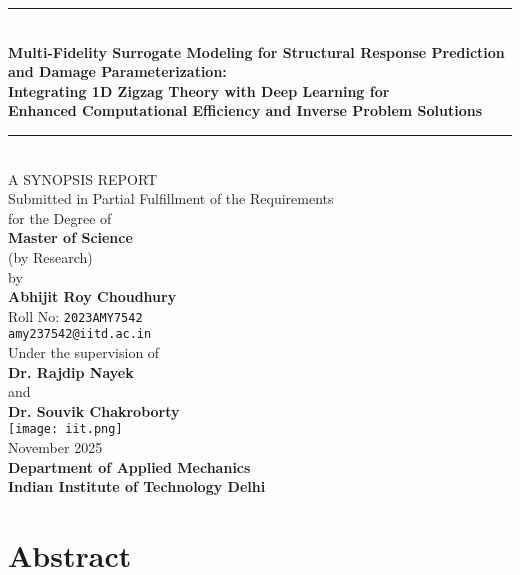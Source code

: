 \documentclass[12pt,a4paper]{report}
\begin{document}
\begin{titlepage}
\centering
\vspace*{-1.5cm}
\rule{\textwidth}{0.6pt} \\[0.3cm]
{\LARGE \textbf{Multi-Fidelity Surrogate Modeling for Structural Response Prediction}}
{\LARGE \textbf{and Damage Parameterization:}}\\[0.25cm]
{\Large \textbf{Integrating 1D Zigzag Theory with Deep Learning for}}\\[0.08cm]
{\Large \textbf{Enhanced Computational Efficiency and Inverse Problem Solutions}} \\[0.3cm]
\rule{\textwidth}{0.6pt} \\[0.03cm]
{\large \textsc{A SYNOPSIS REPORT}}\\[0.3cm]
{\normalsize Submitted in Partial Fulfillment of the Requirements\\
for the Degree of}\\[0.2cm]
{\large \textbf{Master of Science}}\\
{\large (by Research)}\\[0.08cm]
\large by\\[0.2cm]
{\Large \textbf{Abhijit Roy Choudhury}}\\[0.08cm]
{\normalsize Roll No: \texttt{2023AMY7542}}\\
\texttt{amy237542@iitd.ac.in} \\[0.4cm]
{\normalsize Under the supervision of}\\[0.2cm]
{\large \textbf{Dr. Rajdip Nayek}}\\
{\large and}\\
{\large \textbf{Dr. Souvik Chakroborty}}\\[0.5cm]
\texttt{[image: iit.png]} \\[0.5cm]
{\large November 2025} \\[0.2cm]
{\large \textbf{Department of Applied Mechanics}}\\
{\large \textbf{Indian Institute of Technology Delhi}}
\end{titlepage}




\chapter*{Abstract}
\newpage
{}
\end{document}

